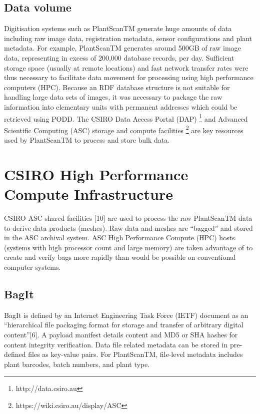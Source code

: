 \documentclass{llncs}
\begin{document}
\subsection{Data volume}
Digitisation systems such as PlantScanTM generate huge amounts of data including
raw image data, registration metadata, sensor configurations and plant metadata.
For example, PlantScanTM generates around 500GB of raw image data, representing
in excess of 200,000 database records, per day. Sufficient storage space
(usually at remote locations) and fast network transfer rates were thus
necessary to facilitate data movement for processing using high performance
computers (HPC). Because an RDF database structure is not suitable for handling
large data sets of images, it was necessary to package the raw information into
elementary units with permanent addresses which could be retrieved using PODD. 
The CSIRO Data Access Portal (DAP) \footnote{http://data.csiro.au} and Advanced
Scientific Computing (ASC) storage and compute facilities
\footnote{https://wiki.csiro.au/display/ASC} are key resources used by PlantScanTM to
process and store bulk data.


\section{CSIRO High Performance Compute Infrastructure}
CSIRO ASC shared facilities [10] are used to process the raw PlantScanTM data to
derive data products (meshes). Raw data and meshes are ``bagged'' and stored in
the ASC archival system. ASC High Performance Compute (HPC) hosts (systems with
high processor count and large memory) are taken advantage of to create and
verify bags more rapidly than would be possible on conventional computer
systems.

\subsection{BagIt}

BagIt is defined by an Internet Engineering Task Force (IETF) document as an
``hierarchical file packaging format for storage and transfer of arbitrary
digital content''[6]. A payload manifest details content and MD5 or SHA hashes
for content integrity verification. Data file related metadata can be stored in
pre-defined files as key-value pairs. For PlantScanTM, file-level metadata
includes plant barcodes, batch numbers, and plant type.
\end{document}
